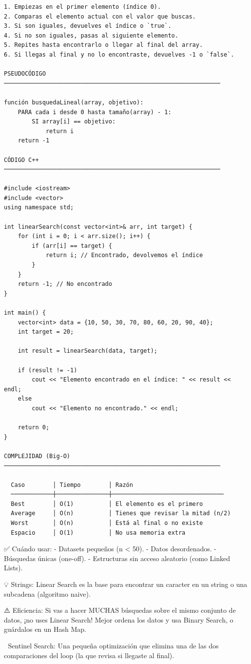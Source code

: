 \begin{lstlisting}
1. Empiezas en el primer elemento (índice 0).
2. Comparas el elemento actual con el valor que buscas.
3. Si son iguales, devuelves el índice o `true`.
4. Si no son iguales, pasas al siguiente elemento.
5. Repites hasta encontrarlo o llegar al final del array.
6. Si llegas al final y no lo encontraste, devuelves -1 o `false`.

PSEUDOCÓDIGO
──────────────────────────────────────────────────────────────

función busquedaLineal(array, objetivo):
    PARA cada i desde 0 hasta tamaño(array) - 1:
        SI array[i] == objetivo:
            return i
    return -1

CÓDIGO C++
──────────────────────────────────────────────────────────────

#include <iostream>
#include <vector>
using namespace std;

int linearSearch(const vector<int>& arr, int target) {
    for (int i = 0; i < arr.size(); i++) {
        if (arr[i] == target) {
            return i; // Encontrado, devolvemos el índice
        }
    }
    return -1; // No encontrado
}

int main() {
    vector<int> data = {10, 50, 30, 70, 80, 60, 20, 90, 40};
    int target = 20;

    int result = linearSearch(data, target);
    
    if (result != -1)
        cout << "Elemento encontrado en el índice: " << result << endl;
    else
        cout << "Elemento no encontrado." << endl;

    return 0;
}

COMPLEJIDAD (Big-O)
──────────────────────────────────────────────────────────────

  Caso        │ Tiempo        │ Razón
  ────────────┼───────────────┼────────────────────────────────
  Best        │ O(1)          │ El elemento es el primero
  Average     │ O(n)          │ Tienes que revisar la mitad (n/2)
  Worst       │ O(n)          │ Está al final o no existe
  Espacio     │ O(1)          │ No usa memoria extra
\end{lstlisting}

\begin{dsaentrevistas}

✅ Cuándo usar: 
   - Datasets pequeños (n < 50).
   - Datos desordenados.
   - Búsquedas únicas (one-off).
   - Estructuras sin acceso aleatorio (como Linked Lists).

💡 Strings: Linear Search es la base para encontrar un caracter en 
   un string o una subcadena (algoritmo naive).

⚠️ Eficiencia: Si vas a hacer MUCHAS búsquedas sobre el mismo conjunto
   de datos, ¡no uses Linear Search! Mejor ordena los datos y usa 
   Binary Search, o guárdalos en un Hash Map.

🔑 Sentinel Search: Una pequeña optimización que elimina una de las
   dos comparaciones del loop (la que revisa si llegaste al final).

\end{dsaentrevistas}

